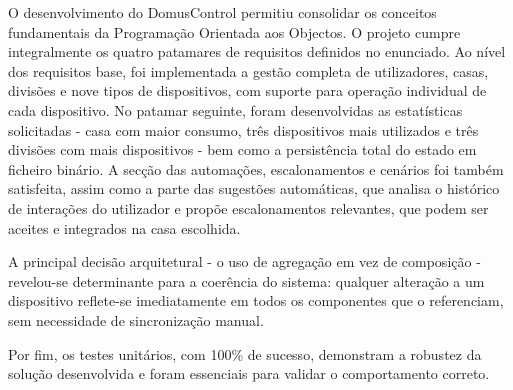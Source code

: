 \documentclass[a4paper]{article}
\begin{document}
O desenvolvimento do DomusControl permitiu consolidar os conceitos fundamentais da Programação Orientada aos Objectos. O projeto cumpre integralmente os quatro patamares de requisitos definidos no enunciado. Ao nível dos requisitos base, foi implementada a gestão completa de utilizadores, casas, divisões e nove tipos de dispositivos, com suporte para operação individual de cada dispositivo. No patamar seguinte, foram desenvolvidas as estatísticas solicitadas - casa com maior consumo, três dispositivos mais utilizados e três divisões com mais dispositivos - bem como a persistência total do estado em ficheiro binário. A secção das automações, escalonamentos e cenários foi também satisfeita, assim como a parte das sugestões automáticas, que analisa o histórico de interações do utilizador e propõe escalonamentos relevantes, que podem ser aceites e integrados na casa escolhida.
 
A principal decisão arquitetural - o uso de agregação em vez de composição - revelou-se determinante para a coerência do sistema: qualquer alteração a um dispositivo reflete-se imediatamente em todos os componentes que o referenciam, sem necessidade de sincronização manual. 

Por fim, os testes unitários, com 100\% de sucesso, demonstram a robustez da solução desenvolvida e foram essenciais para validar o comportamento correto.
\end{document}
